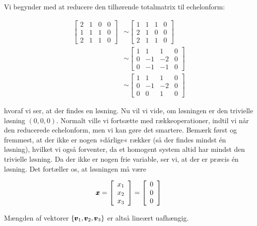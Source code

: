     \begin{solution}
        Vi begynder med at reducere den tilhørende totalmatrix til echelonform:

\[
\begin{aligned}
{\left[\begin{array}{llll}
2 & 1 & 0 & 0 \\
1 & 1 & 1 & 0 \\
2 & 1 & 1 & 0
\end{array}\right] } & \sim\left[\begin{array}{llll}
1 & 1 & 1 & 0 \\
2 & 1 & 0 & 0 \\
2 & 1 & 1 & 0
\end{array}\right] \\
& \sim\left[\begin{array}{cccc}
1 & 1 & 1 & 0 \\
0 & -1 & -2 & 0 \\
0 & -1 & -1 & 0
\end{array}\right] \\
& \sim\left[\begin{array}{cccc}
1 & 1 & 1 & 0 \\
0 & -1 & -2 & 0 \\
0 & 0 & 1 & 0
\end{array}\right]
\end{aligned}
\]

hvoraf vi ser, at der findes en løsning. Nu vil vi vide, om løsningen er den trivielle løsning $(0,0,0)$. Normalt ville vi fortsætte med rækkeoperationer, indtil vi når den reducerede echelonform, men vi kan gøre det smartere. Bemærk først og fremmest, at der ikke er nogen »dårlige« rækker (så der findes mindst én løsning), hvilket vi også forventer, da et homogent system altid har mindst den trivielle løsning. Da der ikke er nogen frie variable, ser vi, at der er præcis én løsning. Det fortæller os, at løsningen må være

\[
\pmb{x}=\left[\begin{array}{l}
x_1 \\
x_2 \\
x_3
\end{array}\right]=\left[\begin{array}{l}
0 \\
0 \\
0
\end{array}\right]
\]

Mængden af vektorer $\left\{\pmb{v}_1, \pmb{v}_2, \pmb{v}_3\right\}$ er altså lineært uafhængig.
\end{solution}

